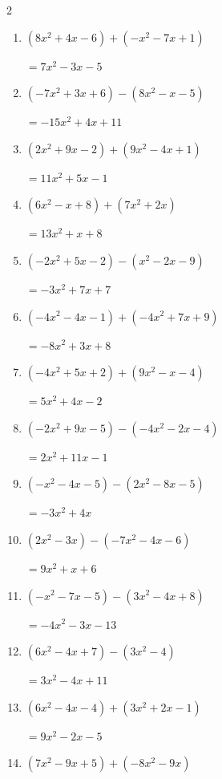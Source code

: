 \begin{multicols}{2}
\begin{enumerate}
        $=-6x^{2}+3x-1$

  \item $(8x^{2}+4x-6)+(-x^{2}-7x+1)$

        $=7x^{2}-3x-5$

  \item $(-7x^{2}+3x+6)-(8x^{2}-x-5)$

        $=-15x^{2}+4x+11$

  \item $(2x^{2}+9x-2)+(9x^{2}-4x+1)$

        $=11x^{2}+5x-1$

  \item $(6x^{2}-x+8)+(7x^{2}+2x)$

        $=13x^{2}+x+8$

  \item $(-2x^{2}+5x-2)-(x^{2}-2x-9)$

        $=-3x^{2}+7x+7$

  \item $(-4x^{2}-4x-1)+(-4x^{2}+7x+9)$

        $=-8x^{2}+3x+8$

  \item $(-4x^{2}+5x+2)+(9x^{2}-x-4)$

        $=5x^{2}+4x-2$

  \item $(-2x^{2}+9x-5)-(-4x^{2}-2x-4)$

        $=2x^{2}+11x-1$

  \item $(-x^{2}-4x-5)-(2x^{2}-8x-5)$

        $=-3x^{2}+4x$

  \item $(2x^{2}-3x)-(-7x^{2}-4x-6)$

        $=9x^{2}+x+6$

  \item $(-x^{2}-7x-5)-(3x^{2}-4x+8)$

        $=-4x^{2}-3x-13$

  \item $(6x^{2}-4x+7)-(3x^{2}-4)$

        $=3x^{2}-4x+11$

  \item $(6x^{2}-4x-4)+(3x^{2}+2x-1)$

        $=9x^{2}-2x-5$

\columnbreak %

  \item $(7x^{2}-9x+5)+(-8x^{2}-9x)$


\end{enumerate}
\end{multicols}
